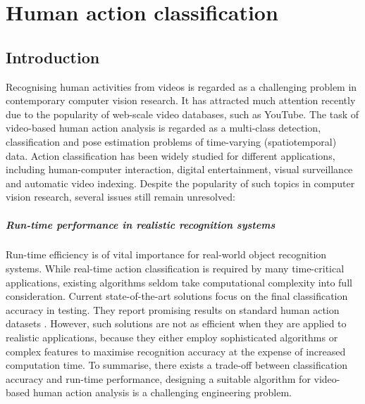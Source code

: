 \chapter{Human action classification}
\label{chap/act}

\section{Introduction}
\label{sec/act/intro}

Recognising human activities from videos is regarded as a challenging problem in contemporary computer vision research. It has attracted much attention recently due to the popularity of web-scale video databases, such as YouTube. The task of video-based human action analysis is regarded as a multi-class detection, classification and pose estimation problems of time-varying (spatiotemporal) data.  Action classification has been widely studied for different applications, including human-computer interaction, digital entertainment, visual surveillance and automatic video indexing. Despite the popularity of such topics in computer vision research, several issues still remain unresolved:   

\paragraph{Run-time performance in realistic recognition systems} Run-time efficiency is of vital importance for real-world object recognition systems. While real-time action classification is required by many time-critical applications, existing algorithms seldom take computational complexity into full consideration. Current state-of-the-art solutions focus on the final classification accuracy in testing. They report promising results on standard human action datasets \cite{Kim2007, Lin2009, Liu2008, Willems2009}. However, such solutions are not as efficient when they are applied to realistic applications, because they either employ sophisticated algorithms or complex features to maximise recognition accuracy at the expense of increased computation time. To summarise, there exists a trade-off between classification accuracy and run-time performance, designing a suitable algorithm for video-based human action analysis is a challenging engineering problem.  

